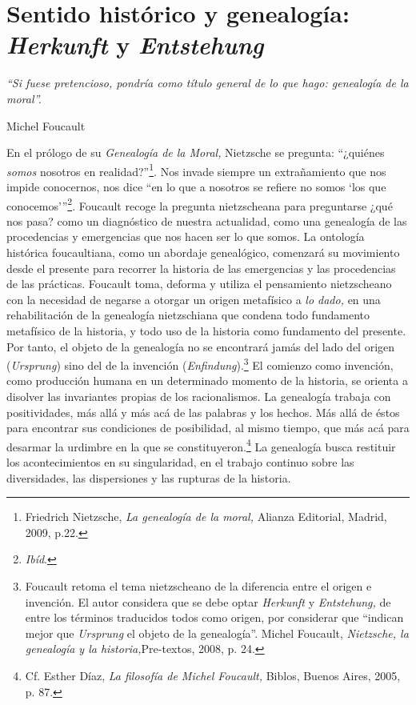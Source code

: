 \section{Sentido histórico y genealogía: \emph{Herkunft} y \emph{Entstehung}}

\epigraph{\emph{\enquote{Si fuese pretencioso, pondría como título general de lo que hago: genealogía de la moral}.}}{Michel Foucault}


En el prólogo de su \emph{Genealogía de la Moral,} Nietzsche se pregunta: \enquote{¿quiénes \emph{somos} nosotros en realidad?}\footnote{Friedrich Nietzsche, \emph{La genealogía de la moral,} Alianza Editorial, Madrid, 2009, p.22.}. Nos invade siempre un extrañamiento que nos impide conocernos, nos dice \enquote{en lo que a nosotros se refiere no somos \enquote{los que conocemos}}\footnote{\emph{Ibíd}.}. Foucault recoge la pregunta nietzscheana para preguntarse ¿qué nos pasa? como un diagnóstico de nuestra actualidad, como una genealogía de las procedencias y emergencias que nos hacen ser lo que somos. La ontología histórica foucaultiana, como un abordaje genealógico, comenzará su movimiento desde el presente para recorrer la historia de las emergencias y las procedencias de las prácticas. Foucault toma, deforma y utiliza el pensamiento nietzscheano con la necesidad de negarse a otorgar un origen metafísico a \emph{lo dado,} en una rehabilitación de la genealogía nietzschiana que condena todo fundamento metafísico de la historia, y todo uso de la historia como fundamento del presente. Por tanto, el objeto de la genealogía no se encontrará jamás del lado del origen (\emph{Ursprung}) sino del de la invención (\emph{Enfindung}).\footnote{Foucault retoma el tema nietzscheano de la diferencia entre el origen e invención. El autor considera que se debe optar \emph{Herkunft} y \emph{Entstehung,} de entre los términos traducidos todos como origen, por considerar que \enquote{indican mejor que \emph{Ursprung} el objeto de la genealogía}. Michel Foucault, \emph{Nietzsche, la genealogía y la historia,}Pre-textos, 2008, p. 24.} El comienzo como invención, como producción humana en un determinado momento de la historia, se orienta a disolver las invariantes propias de los racionalismos. La genealogía trabaja con positividades, más allá y más acá de las palabras y los hechos. Más allá de éstos para encontrar sus condiciones de posibilidad, al mismo tiempo, que más acá para desarmar la urdimbre en la que se constituyeron.\footnote{Cf. Esther Díaz, \emph{La filosofía de Michel Foucault,} Biblos, Buenos Aires, 2005, p. 87.} La genealogía busca restituir los acontecimientos en su singularidad, en el trabajo continuo sobre las diversidades, las dispersiones y las rupturas de la historia.

